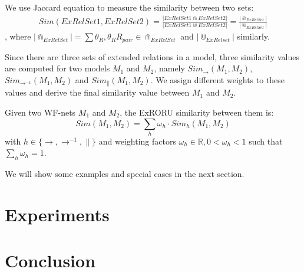 \documentclass{llncs}
\begin{document}
We use Jaccard equation to measure the similarity between two sets:
\begin{equation}
	\begin{aligned}
		Sim(ExRelSet1,ExRelSet2)=\frac{|ExRelSet1\Cap ExRelSet2|}{|ExRelSet1\Cup ExRelSet2|}=\frac{|\Cap_{ExRelSet}|}{|\Cup_{ExRelSet}|}
	\end{aligned}
\end{equation}
, where $|\Cap_{ExRelSet}|=\sum\theta_{R},\theta_{R}R_{pair}\in\Cap_{ExRelSet}$ and $|\Cup_{ExRelset}|$ similarly.

Since there are three sets of extended relations in a model, three similarity values are computed for two models $M_{1}$ and $M_{2}$, namely $Sim_{\rightarrow}(M_{1},M_{2})$, $Sim_{\rightarrow^{-1}}(M_{1},M_{2})$ and $Sim_{\parallel}(M_{1},M_{2})$. We assign different weights to these values and derive the final similarity value between $M_{1}$ and $M_{2}$.

\begin{definition}\label{def:similarity}
Given two WF-nets $M_{1}$ and $M_{2}$, the ExRORU similarity between them is:\\
\begin{equation}\label{eq:similarity}
Sim(M_{1},M_{2})=\sum_{h}\omega_{h}\cdot Sim_{h}(M_{1},M_{2})
\end{equation}
with $h\in\{\rightarrow,\rightarrow^{-1},\parallel\}$ and weighting factors $\omega_{h}\in\mathbb{R},0<\omega_{h}<1$ such that $\sum\limits_{h}\omega_{h}=1$.
\end{definition}

We will show some examples and special cases in the next section.

\section{Experiments}\label{sec:experiments}

\section{Conclusion}\label{sec:conclusion}




\end{document}
